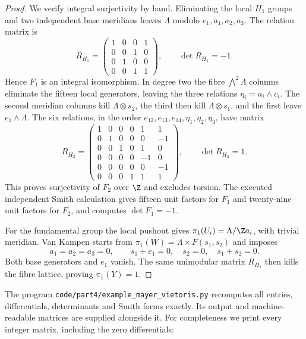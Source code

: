 \begin{proof}
We verify integral surjectivity by hand. Eliminating the local $H_1$
groups and two independent base meridians leaves $\Lambda$ modulo
$e_1,a_1,a_2,a_3$. The relation matrix is
\[
 R_{H_1}=\begin{pmatrix}1&0&0&1\\0&0&1&0\\0&1&0&0\\0&0&1&1\end{pmatrix},
 \qquad\det R_{H_1}=-1.
\]
Hence $F_1$ is an integral isomorphism. In degree two the fibre
$\bigwedge^2\Lambda$ columns eliminate the fifteen local generators,
leaving the three relations $\eta_i=a_i\wedge c_i$. The second meridian
columns kill $\Lambda\otimes s_2$, the third then kill
$\Lambda\otimes s_1$, and the first leave $e_1\wedge\Lambda$. The six
relations, in the order $e_{12},e_{13},e_{14},\eta_1,\eta_2,\eta_3$, have
matrix
\[
R_{H_2}=\begin{pmatrix}
1&0&0&0&1&1\\0&1&0&0&0&-1\\0&0&1&0&1&0\\
0&0&0&0&-1&0\\0&0&0&0&0&-1\\0&0&0&1&1&1
\end{pmatrix},\qquad \det R_{H_2}=1.
\]
This proves surjectivity of $F_2$ over $\Z$ and excludes torsion. The
executed independent Smith calculation gives fifteen unit factors for
$F_1$ and twenty-nine unit factors for $F_2$, and computes $\det F_1=-1$.

For the fundamental group the local pushout gives
$\pi_1(U_i)=\Lambda/\Z a_i$, with trivial meridian. Van Kampen starts
from $\pi_1(W)=\Lambda\times F(s_1,s_2)$ and imposes
\[
 a_1=a_2=a_3=0,\qquad s_1+e_1=0,\quad s_2=0,\quad s_1+s_2=0.
\]
Both base generators and $e_1$ vanish. The same unimodular matrix
$R_{H_1}$ then kills the fibre lattice, proving $\pi_1(Y)=1$.
\end{proof}

The program \texttt{code/part4/example\_mayer\_vietoris.py} recomputes all
entries, differentials, determinants and Smith forms exactly. Its output
and machine-readable matrices are supplied alongside it. For completeness
we print every integer matrix, including the zero differentials:



